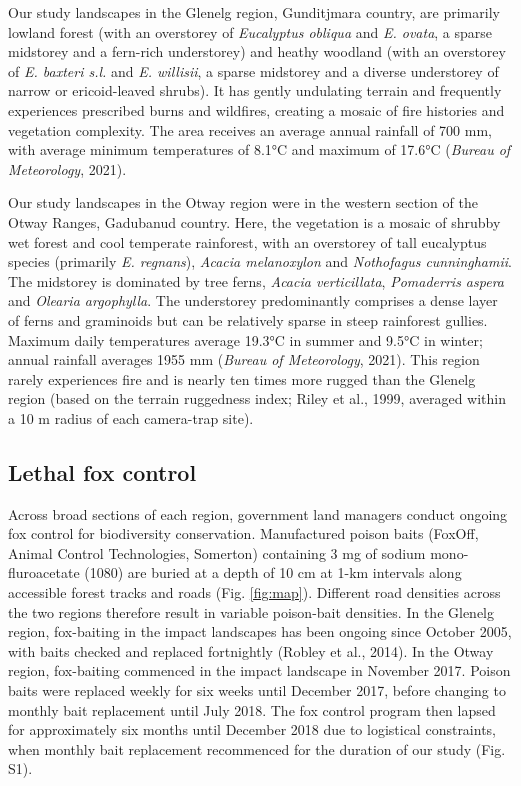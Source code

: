 \documentclass[]{elsarticle} %
\begin{document}
Our study landscapes in the Glenelg region, Gunditjmara country, are primarily lowland forest (with an overstorey of \emph{Eucalyptus obliqua} and \emph{E. ovata}, a sparse midstorey and a fern-rich understorey) and heathy woodland (with an overstorey of \emph{E. baxteri s.l.} and \emph{E. willisii}, a sparse midstorey and a diverse understorey of narrow or ericoid-leaved shrubs).
It has gently undulating terrain and frequently experiences prescribed burns and wildfires, creating a mosaic of fire histories and vegetation complexity.
The area receives an average annual rainfall of 700 mm, with average minimum temperatures of 8.1°C and maximum of 17.6°C (\emph{Bureau of Meteorology}, 2021).

Our study landscapes in the Otway region were in the western section of the Otway Ranges, Gadubanud country.
Here, the vegetation is a mosaic of shrubby wet forest and cool temperate rainforest, with an overstorey of tall eucalyptus species (primarily \emph{E. regnans}), \emph{Acacia melanoxylon} and \emph{Nothofagus cunninghamii}.
The midstorey is dominated by tree ferns, \emph{Acacia verticillata}, \emph{Pomaderris aspera} and \emph{Olearia argophylla}.
The understorey predominantly comprises a dense layer of ferns and graminoids but can be relatively sparse in steep rainforest gullies. Maximum daily temperatures average 19.3°C in summer and 9.5°C in winter; annual rainfall averages 1955 mm (\emph{Bureau of Meteorology}, 2021).
This region rarely experiences fire and is nearly ten times more rugged than the Glenelg region (based on the terrain ruggedness index; Riley et al., 1999, averaged within a 10 m radius of each camera-trap site).

\hypertarget{lethal-fox-control}{%
\subsection{Lethal fox control}\label{lethal-fox-control}}

Across broad sections of each region, government land managers conduct ongoing fox control for biodiversity conservation.
Manufactured poison baits (FoxOff, Animal Control Technologies, Somerton) containing 3 mg of sodium mono-fluroacetate (1080) are buried at a depth of 10 cm at 1-km intervals along accessible forest tracks and roads (Fig. \ref{fig:map}).
Different road densities across the two regions therefore result in variable poison-bait densities. In the Glenelg region, fox-baiting in the impact landscapes has been ongoing since October 2005, with baits checked and replaced fortnightly (Robley et al., 2014). In the Otway region, fox-baiting commenced in the impact landscape in November 2017. Poison baits were replaced weekly for six weeks until December 2017, before changing to monthly bait replacement until July 2018. The fox control program then lapsed for approximately six months until December 2018 due to logistical constraints, when monthly bait replacement recommenced for the duration of our study (Fig. S1).
\end{document}
